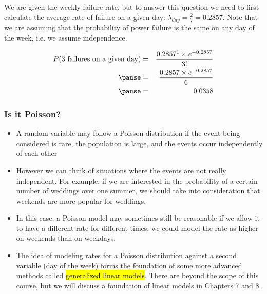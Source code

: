 
\begin{frame}


\pause

We are given the weekly failure rate, but to answer this question we need to first calculate the average rate of failure on a given day: $\lambda_{day} = \frac{2}{7} = 0.2857$. Note that we are assuming that the probability of power failure is the same on any day of the week, i.e. we assume independence.

\pause

\begin{eqnarray*}
P(\text{3 failures on a given day}) &=& \frac{0.2857^1 \times e^{-0.2857}}{3!} \\
\pause
&=& \frac{0.2857 \times e^{-0.2857}}{6} \\
\pause
&=& 0.0358
\end{eqnarray*}

\end{frame}


\begin{frame}
\frametitle{Is it Poisson?}

\begin{itemize}

\item A random variable may follow a Poisson distribution if the event being considered is rare, the population is large, and the events occur independently of each other

\item However we can think of situations where the events are not really independent. For example, if we are interested in the probability of a certain number of weddings over one summer, we should take into consideration that weekends are more popular for weddings.

\item In this case, a Poisson model may sometimes still be reasonable if we allow it to have a different rate for different times; we could model the rate as higher on weekends than on weekdays.

\item The idea of modeling rates for a Poisson distribution against a second variable (day of the week) forms the
foundation of some more advanced methods called \hl{generalized linear models}. There are beyond the scope of this course, but we will discuss a foundation of linear models in Chapters 7 and 8.

\end{itemize}

\end{frame}

